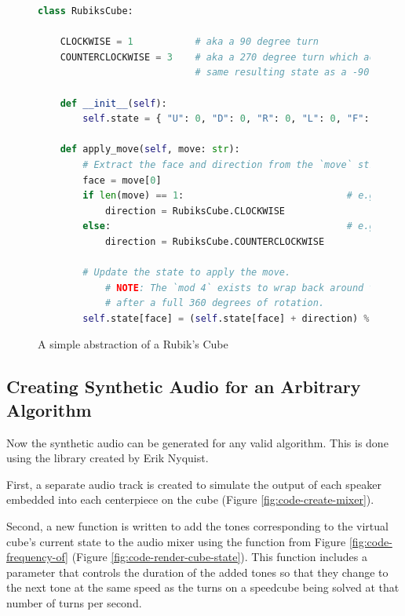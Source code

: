 \begin{figure}[h]
\caption{A simple abstraction of a Rubik's Cube}
\label{fig:rubiks-cube-code}
\begin{lstlisting}[language=Python]
class RubiksCube:
    
    CLOCKWISE = 1           # aka a 90 degree turn
    COUNTERCLOCKWISE = 3    # aka a 270 degree turn which achieves the
                            # same resulting state as a -90 degree turn

    def __init__(self):
        self.state = { "U": 0, "D": 0, "R": 0, "L": 0, "F": 0, "B": 0 }
    
    def apply_move(self, move: str):
        # Extract the face and direction from the `move` string.
        face = move[0]
        if len(move) == 1:                             # e.g. U
            direction = RubiksCube.CLOCKWISE
        else:                                          # e.g. U'
            direction = RubiksCube.COUNTERCLOCKWISE
        
        # Update the state to apply the move.
            # NOTE: The `mod 4` exists to wrap back around to 0
            # after a full 360 degrees of rotation.
        self.state[face] = (self.state[face] + direction) % 4
\end{lstlisting}
\end{figure}

\subsection{Creating Synthetic Audio for an Arbitrary Algorithm}
\label{subsec:generate-audible-algorithm}

Now the synthetic audio can be generated for any valid algorithm. This
is done using the  library created by Erik Nyquist.
\cite{pip-tones}

First, a separate audio track is created to simulate the output of each
speaker embedded into each centerpiece on the cube (Figure
\ref{fig:code-create-mixer}).

Second, a new function is written to add the tones corresponding to the
virtual cube's current state to the audio mixer using the
 function from Figure \ref{fig:code-frequency-of}
(Figure \ref{fig:code-render-cube-state}). This function includes a
 parameter that controls the duration of the added tones so
that they change to the next tone at the same speed as the turns on a
speedcube being solved at that number of turns per second.

